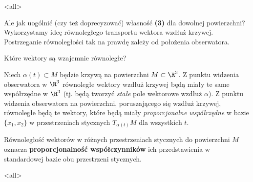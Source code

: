 \mode<all>{}

\begin{frame}[<+->]
Ale jak uogólnić (czy też doprecyzować) własność \textbf{(3)} dla dowolnej powierzchni? Wykorzystamy ideę równoległego transportu wektora wzdłuż krzywej. \pause Postrzeganie równoległości tak na prawdę zależy od położenia obserwatora. 
\begin{center}

\bigskip Które wektory są wzajemnie równoległe?
\end{center}

\end{frame}

Niech $\alpha(t)\subset M$ będzie krzywą na powierzchni $M\subset \R^3$. Z punktu widzenia obserwatora w $\R^3$ równoległe wektory wzdłuż krzywej będą miały te same współrzędne w $\R^3$ (tj. będą tworzyć \textit{stałe} pole wektorowe wzdłuż $\alpha$). Z punktu widzenia obserwatora na powierzchni, poruszającego się wzdłuż krzywej, równoległe będą te wektory, które będą miały \textit{proporcjonalne współrzędne} w bazie $\{x_1, x_2\}$ w przestrzeniach stycznych $T_{\alpha(t)}M$ dla wszystkich $t$.

\begin{frame}[<+->]
\begin{uwaga}
Równoległość wektorów w różnych przestrzeniach stycznych do powierzchni $M$ oznacza \textbf{proporcjonalność współczynników} ich przedstawienia w standardowej bazie obu przestrzeni stycznych.
\end{uwaga}




\end{frame}
\mode<all>{}

